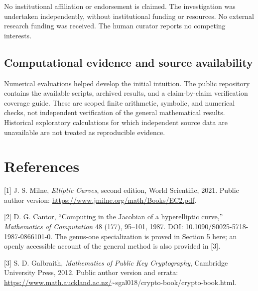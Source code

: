 \documentclass[
  11pt,
  a4paper,
]{article}
\begin{document}
No institutional affiliation or endorsement is claimed. The
investigation was undertaken independently, without institutional
funding or resources. No external research funding was received. The
human curator reports no competing interests.

\subsection{Computational evidence and source
availability}\label{computational-evidence-and-source-availability}

Numerical evaluations helped develop the initial intuition. The public
repository contains the available scripts, archived results, and a
claim-by-claim verification coverage guide. These are scoped finite
arithmetic, symbolic, and numerical checks, not independent verification
of the general mathematical results. Historical exploratory calculations
for which independent source data are unavailable are not treated as
reproducible evidence.

\section{References}\label{references}

{[}1{]} J. S. Milne, \emph{Elliptic Curves}, second edition, World
Scientific, 2021. Public author version:
\url{https://www.jmilne.org/math/Books/EC2.pdf}.

{[}2{]} D. G. Cantor, ``Computing in the Jacobian of a hyperelliptic
curve,'' \emph{Mathematics of Computation} 48 (177), 95--101, 1987. DOI:
10.1090/S0025-5718-1987-0866101-0. The genus-one specialization is
proved in Section 5 here; an openly accessible account of the general
method is also provided in {[}3{]}.

{[}3{]} S. D. Galbraith, \emph{Mathematics of Public Key Cryptography},
Cambridge University Press, 2012. Public author version and errata:
\url{https://www.math.auckland.ac.nz/}\textasciitilde sgal018/crypto-book/crypto-book.html.
\end{document}
